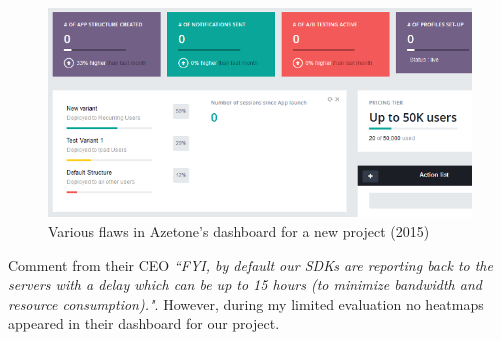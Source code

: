 \begin{figure}[ht]
    \centering
    \includegraphics[width=12cm]{images/azetone/azetone_dashboard_flaws_for_kiwix_2015.png}
    \caption{Various flaws in Azetone's dashboard for a new project (2015)}
    \label{fig:azetone_dashboard_flaws_for_kiwix_2015}
\end{figure}

Comment from their CEO \emph{``FYI, by default our SDKs are reporting back to the servers with a delay which can be up to 15 hours (to minimize bandwidth and resource consumption)."}. However, during my limited evaluation no heatmaps appeared in their dashboard for our project.
